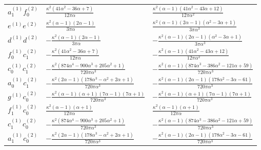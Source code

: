 {\begin{longtable}{lll}
$a_1^{(1)} f_0^{(2)}$ & $\frac{\kappa^{2} \left(41 \alpha^{2} - 36 \alpha + 7\right)}{12 \pi \alpha}$ & $\frac{\kappa^{2} \left(\alpha - 1\right) \left(41 \alpha^{2} - 43 \alpha + 12\right)}{12 \pi \alpha^{2}}$\\
$e^{(1)} e^{(2)}$ & $\frac{\kappa^{2} \left(\alpha - 1\right) \left(2 \alpha - 1\right)}{3 \pi \alpha}$ & $\frac{\kappa^{2} \left(\alpha - 1\right) \left(2 \alpha - 1\right) \left(\alpha^{2} - 3 \alpha + 1\right)}{3 \pi \alpha^{3}}$\\
$d^{(1)} d^{(2)}$ & $- \frac{\kappa^{2} \left(\alpha - 1\right) \left(2 \alpha - 1\right)}{3 \pi \alpha}$ & $- \frac{\kappa^{2} \left(\alpha - 1\right) \left(2 \alpha - 1\right) \left(\alpha^{2} - 3 \alpha + 1\right)}{3 \pi \alpha^{3}}$\\
$f_0^{(1)} c_1^{(2)}$ & $- \frac{\kappa^{2} \left(41 \alpha^{2} - 36 \alpha + 7\right)}{12 \pi \alpha}$ & $- \frac{\kappa^{2} \left(\alpha - 1\right) \left(41 \alpha^{2} - 43 \alpha + 12\right)}{12 \pi \alpha^{2}}$\\
$c_0^{(1)} c_1^{(2)}$ & $- \frac{\kappa^{2} \left(874 \alpha^{4} - 900 \alpha^{3} + 205 \alpha^{2} + 1\right)}{720 \pi \alpha^{3}}$ & $- \frac{\kappa^{2} \left(\alpha - 1\right) \left(874 \alpha^{3} - 386 \alpha^{2} - 121 \alpha + 59\right)}{720 \pi \alpha^{3}}$\\
$a_0^{(1)} c_1^{(2)}$ & $- \frac{\kappa^{2} \left(2 \alpha - 1\right) \left(178 \alpha^{3} - \alpha^{2} + 2 \alpha + 1\right)}{720 \pi \alpha^{3}}$ & $- \frac{\kappa^{2} \left(\alpha - 1\right) \left(2 \alpha - 1\right) \left(178 \alpha^{2} - 3 \alpha - 61\right)}{720 \pi \alpha^{3}}$\\
$g^{(1)} c_0^{(2)}$ & $- \frac{\kappa^{2} \left(\alpha - 1\right) \left(\alpha + 1\right) \left(7 \alpha - 1\right) \left(7 \alpha + 1\right)}{720 \pi \alpha^{3}}$ & $- \frac{\kappa^{2} \left(\alpha - 1\right) \left(\alpha + 1\right) \left(7 \alpha - 1\right) \left(7 \alpha + 1\right)}{720 \pi \alpha^{3}}$\\
$f_1^{(1)} c_0^{(2)}$ & $\frac{\kappa^{2} \left(\alpha - 1\right) \left(\alpha + 1\right)}{12 \pi \alpha}$ & $\frac{\kappa^{2} \left(\alpha - 1\right) \left(\alpha + 1\right)}{12 \pi \alpha}$\\
$c_1^{(1)} c_0^{(2)}$ & $- \frac{\kappa^{2} \left(874 \alpha^{4} - 900 \alpha^{3} + 205 \alpha^{2} + 1\right)}{720 \pi \alpha^{3}}$ & $- \frac{\kappa^{2} \left(\alpha - 1\right) \left(874 \alpha^{3} - 386 \alpha^{2} - 121 \alpha + 59\right)}{720 \pi \alpha^{3}}$\\
$a_1^{(1)} c_0^{(2)}$ & $- \frac{\kappa^{2} \left(2 \alpha - 1\right) \left(178 \alpha^{3} - \alpha^{2} + 2 \alpha + 1\right)}{720 \pi \alpha^{3}}$ & $- \frac{\kappa^{2} \left(\alpha - 1\right) \left(2 \alpha - 1\right) \left(178 \alpha^{2} - 3 \alpha - 61\right)}{720 \pi \alpha^{3}}$\\

\end{longtable}}
